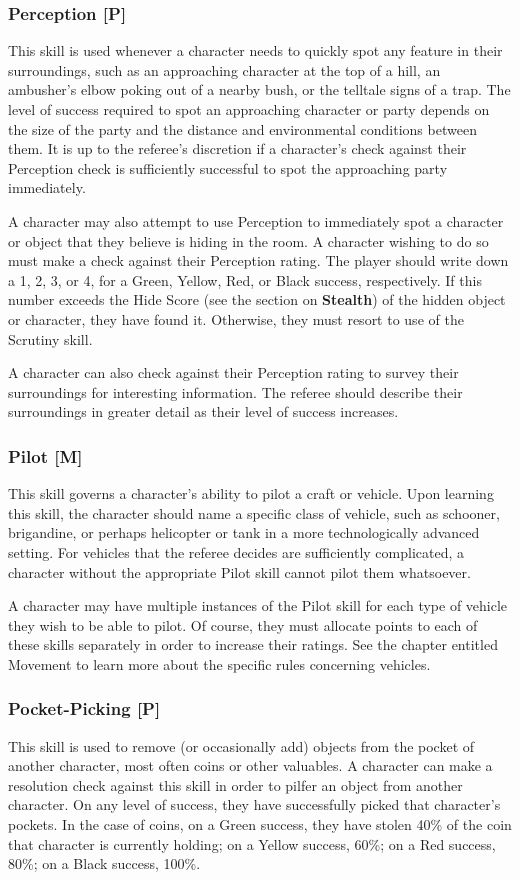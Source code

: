 \documentclass[oneside]{book}
\begin{document}
\begin{multicols}{2}
\subsubsection{Perception [P]}
This skill is used whenever a character needs to quickly spot any feature in their surroundings, such as an approaching character at the top of a hill, an ambusher's elbow poking out of a nearby bush, or the telltale signs of a trap. The level of success required to spot an approaching character or party depends on the size of the party and the distance and environmental conditions between them. It is up to the referee's discretion if a character's check against their Perception check is sufficiently successful to spot the approaching party immediately. 

A character may also attempt to use Perception to immediately spot a character or object that they believe is hiding in the room. A character wishing to do so must make a check against their Perception rating. The player should write down a 1, 2, 3, or 4, for a Green, Yellow, Red, or Black success, respectively. If this number exceeds the Hide Score (see the section on \textbf{Stealth}) of the hidden object or character, they have found it. Otherwise, they must resort to use of the Scrutiny skill.

A character can also check against their Perception rating to survey their surroundings for interesting information. The referee should describe their surroundings in greater detail as their level of success increases. 


\subsubsection{Pilot [M]}
This skill governs a character's ability to pilot a craft or vehicle. Upon learning this skill, the character should name a specific class of vehicle, such as schooner, brigandine, or perhaps helicopter or tank in a more technologically advanced setting. For vehicles that the referee decides are sufficiently complicated, a character without the appropriate Pilot skill cannot pilot them whatsoever.

A character may have multiple instances of the Pilot skill for each type of vehicle they wish to be able to pilot. Of course, they must allocate points to each of these skills separately in order to increase their ratings.
See the chapter entitled Movement to learn more about the specific rules concerning vehicles. 

\subsubsection{Pocket-Picking [P]}
This skill is used to remove (or occasionally add) objects from the pocket of another character, most often coins or other valuables. A character can make a resolution check against this skill in order to pilfer an object from another character. On any level of success, they have successfully picked that character's pockets. In the case of coins, on a Green success, they have stolen 40\% of the coin that character is currently holding; on a Yellow success, 60\%; on a Red success, 80\%; on a Black success, 100\%.


\end{multicols}
\end{document}
